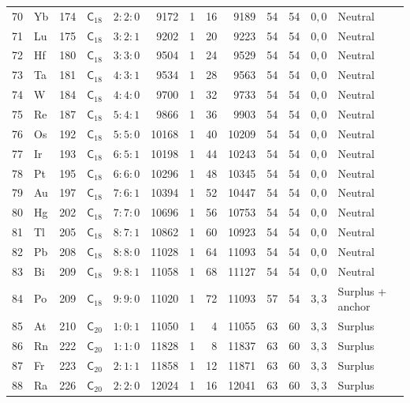 {\begin{longtable}{@{}rllccrrrrrrll@{}}
70 & Yb & 174 & $\mathsf{C}_{18}$ & $2:2:0$ & 9172 & 1 & 16 & 9189 & 54 & 54 & $0,0$ & Neutral\\
71 & Lu & 175 & $\mathsf{C}_{18}$ & $3:2:1$ & 9202 & 1 & 20 & 9223 & 54 & 54 & $0,0$ & Neutral\\
72 & Hf & 180 & $\mathsf{C}_{18}$ & $3:3:0$ & 9504 & 1 & 24 & 9529 & 54 & 54 & $0,0$ & Neutral\\
73 & Ta & 181 & $\mathsf{C}_{18}$ & $4:3:1$ & 9534 & 1 & 28 & 9563 & 54 & 54 & $0,0$ & Neutral\\
74 & W & 184 & $\mathsf{C}_{18}$ & $4:4:0$ & 9700 & 1 & 32 & 9733 & 54 & 54 & $0,0$ & Neutral\\
75 & Re & 187 & $\mathsf{C}_{18}$ & $5:4:1$ & 9866 & 1 & 36 & 9903 & 54 & 54 & $0,0$ & Neutral\\
76 & Os & 192 & $\mathsf{C}_{18}$ & $5:5:0$ & 10168 & 1 & 40 & 10209 & 54 & 54 & $0,0$ & Neutral\\
77 & Ir & 193 & $\mathsf{C}_{18}$ & $6:5:1$ & 10198 & 1 & 44 & 10243 & 54 & 54 & $0,0$ & Neutral\\
78 & Pt & 195 & $\mathsf{C}_{18}$ & $6:6:0$ & 10296 & 1 & 48 & 10345 & 54 & 54 & $0,0$ & Neutral\\
79 & Au & 197 & $\mathsf{C}_{18}$ & $7:6:1$ & 10394 & 1 & 52 & 10447 & 54 & 54 & $0,0$ & Neutral\\
80 & Hg & 202 & $\mathsf{C}_{18}$ & $7:7:0$ & 10696 & 1 & 56 & 10753 & 54 & 54 & $0,0$ & Neutral\\
81 & Tl & 205 & $\mathsf{C}_{18}$ & $8:7:1$ & 10862 & 1 & 60 & 10923 & 54 & 54 & $0,0$ & Neutral\\
82 & Pb & 208 & $\mathsf{C}_{18}$ & $8:8:0$ & 11028 & 1 & 64 & 11093 & 54 & 54 & $0,0$ & Neutral\\
83 & Bi & 209 & $\mathsf{C}_{18}$ & $9:8:1$ & 11058 & 1 & 68 & 11127 & 54 & 54 & $0,0$ & Neutral\\
84 & Po & 209 & $\mathsf{C}_{18}$ & $9:9:0$ & 11020 & 1 & 72 & 11093 & 57 & 54 & $3,3$ & Surplus + anchor\\
85 & At & 210 & $\mathsf{C}_{20}$ & $1:0:1$ & 11050 & 1 & 4 & 11055 & 63 & 60 & $3,3$ & Surplus\\
86 & Rn & 222 & $\mathsf{C}_{20}$ & $1:1:0$ & 11828 & 1 & 8 & 11837 & 63 & 60 & $3,3$ & Surplus\\
87 & Fr & 223 & $\mathsf{C}_{20}$ & $2:1:1$ & 11858 & 1 & 12 & 11871 & 63 & 60 & $3,3$ & Surplus\\
88 & Ra & 226 & $\mathsf{C}_{20}$ & $2:2:0$ & 12024 & 1 & 16 & 12041 & 63 & 60 & $3,3$ & Surplus\\

\end{longtable}}
